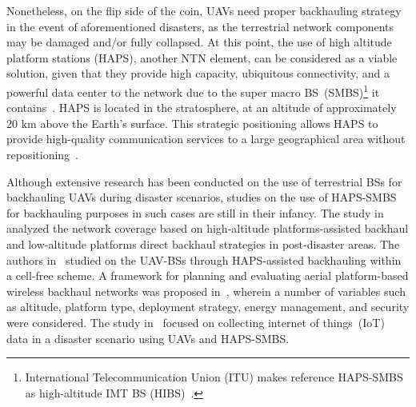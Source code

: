 \documentclass[conference, a4paper]{IEEEtran}
\begin{document}
Nonetheless, on the flip side of the coin, UAVs need proper backhauling strategy in the event of aforementioned disasters, as the terrestrial network components may be damaged and/or fully collapsed.
At this point, the use of high altitude platform stations (HAPS), another NTN element, can be considered as a viable solution, given that they provide high capacity, ubiquitous connectivity, and a powerful data center to the network due to the super macro BS~(SMBS)\footnote{International Telecommunication Union (ITU) makes reference HAPS-SMBS as high-altitude IMT BS (HIBS)~\cite{itu_vision_june_23}.} it contains~\cite{haps-smbs}.
HAPS is located in the stratosphere, at an altitude of approximately 20 km above the Earth's surface. 
This strategic positioning allows HAPS to provide high-quality communication services to a large geographical area without repositioning~\cite{main_survey}. 

Although extensive research has been conducted on the use of terrestrial BSs for backhauling UAVs during disaster scenarios, studies on the use of HAPS-SMBS for backhauling purposes in such cases are still in their infancy. 
The study in~\cite{Backhaul_Cons} analyzed the network coverage based on high-altitude platforms-assisted backhaul and low-altitude platforms direct backhaul strategies in post-disaster areas. 
The authors in~\cite{Omid} studied on the UAV-BSs through HAPS-assisted backhauling within a cell-free scheme. 
A framework for planning and evaluating aerial platform-based wireless backhaul networks was proposed in~\cite{wireless_bachaul}, wherein a number of variables such as altitude, platform type, deployment strategy, energy management, and security were considered.
The study in~\cite{IoT_Collecting} focused on collecting internet of things~(IoT) data in a disaster scenario using UAVs and HAPS-SMBS.
\end{document}
